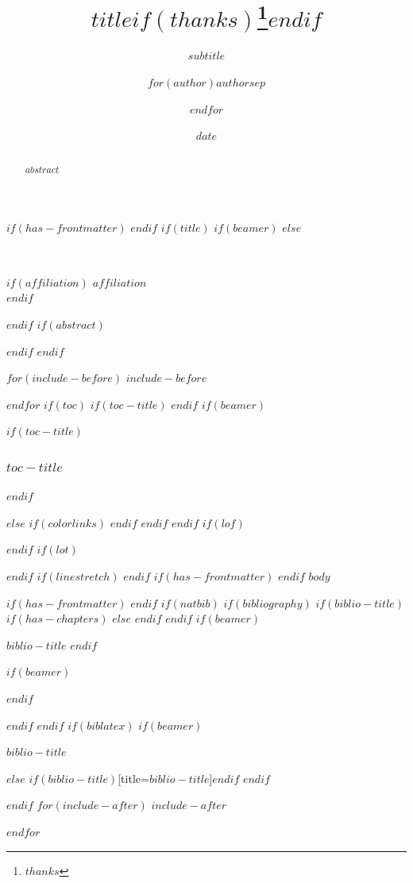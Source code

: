 \documentclass[
$if(fontsize)$
  $fontsize$,
$endif$
$if(papersize)$
  $papersize$paper,
$endif$
$if(beamer)$
  ignorenonframetext,
$if(handout)$
  handout,
$endif$
$if(aspectratio)$
  aspectratio=$aspectratio$,
$endif$
$endif$
$for(classoption)$
  $classoption$$sep$,
$endfor$
]{$documentclass$}
\title{$title$$if(thanks)$\thanks{$thanks$}$endif$}
\subtitle{$subtitle$}
\author{$for(author)$$author$$sep$ \and $endfor$}
\date{$date$}
\institute{$for(institute)$$institute$$sep$ \and $endfor$}
\makeatletter
\newif\ifbibliography
\renewcommand{\maketitle}{%
  \vspace*{-1.5em}%
  \begin{center}%
    {\section*{\centering\@title}} 
  \end{center}%
  \vspace{0.6em}%
\begin{center}%
  \small\itshape\@author\\
$if(affiliation)$  $affiliation$\\
$endif$  \@date\par%
\end{center}%
  \vspace{1em}%
}
\makeatother
\begin{document}
$if(has-frontmatter)$
\frontmatter
$endif$
$if(title)$
$if(beamer)$
\frame{\titlepage}
$else$
\maketitle
$endif$
$if(abstract)$
\begin{abstract}
$abstract$
\end{abstract}
$endif$
$endif$

$for(include-before)$
$include-before$

$endfor$
$if(toc)$
$if(toc-title)$
\renewcommand*\contentsname{$toc-title$}
$endif$
$if(beamer)$
\begin{frame}[allowframebreaks]
$if(toc-title)$
  \frametitle{$toc-title$}
$endif$
  \tableofcontents[hideallsubsections]
\end{frame}
$else$
{
$if(colorlinks)$
\hypersetup{linkcolor=$if(toccolor)$$toccolor$$else$$endif$}
$endif$
\setcounter{tocdepth}{$toc-depth$}
\tableofcontents
}
$endif$
$endif$
$if(lof)$
\listoffigures
$endif$
$if(lot)$
\listoftables
$endif$
$if(linestretch)$
$endif$
$if(has-frontmatter)$
\mainmatter
$endif$
$body$

$if(has-frontmatter)$
\backmatter
$endif$
$if(natbib)$
$if(bibliography)$
$if(biblio-title)$
$if(has-chapters)$
\renewcommand\bibname{$biblio-title$}
$else$
\renewcommand\refname{$biblio-title$}
$endif$
$endif$
$if(beamer)$
\begin{frame}[allowframebreaks]{$biblio-title$}
  \bibliographytrue
$endif$
  
$if(beamer)$
\end{frame}
$endif$

$endif$
$endif$
$if(biblatex)$
$if(beamer)$
\begin{frame}[allowframebreaks]{$biblio-title$}
  \bibliographytrue
  \printbibliography[heading=none]
\end{frame}
$else$
\printbibliography$if(biblio-title)$[title=$biblio-title$]$endif$
$endif$

$endif$
$for(include-after)$
$include-after$

$endfor$
\end{document}

